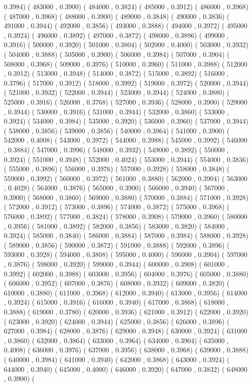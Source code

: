 \documentclass[10pt]{article}
\begin{document}
0.3984)  ( 483000 , 0.3900)  ( 484000 , 0.3824)  ( 485000 , 0.3912)  ( 486000 , 0.3968)  ( 487000 , 0.3968)  ( 488000 , 0.3900)  ( 489000 , 0.3848)  ( 490000 , 0.3836)  ( 491000 , 0.3944)  ( 492000 , 0.3856)  ( 493000 , 0.3888)  ( 494000 , 0.3972)  ( 495000 , 0.3924)  ( 496000 , 0.3892)  ( 497000 , 0.3872)  ( 498000 , 0.3896)  ( 499000 , 0.3916)  ( 500000 , 0.3920)  ( 501000 , 0.3804)  ( 502000 , 0.4000)  ( 503000 , 0.3932)  ( 504000 , 0.3888)  ( 505000 , 0.3900)  ( 506000 , 0.3984)  ( 507000 , 0.3904)  ( 508000 , 0.3968)  ( 509000 , 0.3976)  ( 510000 , 0.3960)  ( 511000 , 0.3988)  ( 512000 , 0.3912)  ( 513000 , 0.3948)  ( 514000 , 0.3872)  ( 515000 , 0.3892)  ( 516000 , 0.3796)  ( 517000 , 0.3912)  ( 518000 , 0.3992)  ( 519000 , 0.3972)  ( 520000 , 0.3944)  ( 521000 , 0.3932)  ( 522000 , 0.3944)  ( 523000 , 0.3944)  ( 524000 , 0.3880)  ( 525000 , 0.3916)  ( 526000 , 0.3768)  ( 527000 , 0.3936)  ( 528000 , 0.3900)  ( 529000 , 0.3944)  ( 530000 , 0.3916)  ( 531000 , 0.3944)  ( 532000 , 0.3860)  ( 533000 , 0.3924)  ( 534000 , 0.3984)  ( 535000 , 0.3920)  ( 536000 , 0.3960)  ( 537000 , 0.3944)  ( 538000 , 0.3856)  ( 539000 , 0.3856)  ( 540000 , 0.3964)  ( 541000 , 0.3900)  ( 542000 , 0.4008)  ( 543000 , 0.3972)  ( 544000 , 0.3988)  ( 545000 , 0.3992)  ( 546000 , 0.3884)  ( 547000 , 0.3996)  ( 548000 , 0.3932)  ( 549000 , 0.3892)  ( 550000 , 0.3924)  ( 551000 , 0.3948)  ( 552000 , 0.4024)  ( 553000 , 0.3944)  ( 554000 , 0.3836)  ( 555000 , 0.3896)  ( 556000 , 0.3976)  ( 557000 , 0.3928)  ( 558000 , 0.3848)  ( 559000 , 0.3992)  ( 560000 , 0.3972)  ( 561000 , 0.3880)  ( 562000 , 0.3904)  ( 563000 , 0.4028)  ( 564000 , 0.3876)  ( 565000 , 0.3900)  ( 566000 , 0.3940)  ( 567000 , 0.3900)  ( 568000 , 0.3860)  ( 569000 , 0.3880)  ( 570000 , 0.3884)  ( 571000 , 0.3928)  ( 572000 , 0.3912)  ( 573000 , 0.3896)  ( 574000 , 0.3872)  ( 575000 , 0.3968)  ( 576000 , 0.3892)  ( 577000 , 0.3824)  ( 578000 , 0.3908)  ( 579000 , 0.3960)  ( 580000 , 0.3956)  ( 581000 , 0.3892)  ( 582000 , 0.3856)  ( 583000 , 0.3820)  ( 584000 , 0.3924)  ( 585000 , 0.3840)  ( 586000 , 0.3884)  ( 587000 , 0.3984)  ( 588000 , 0.3928)  ( 589000 , 0.3856)  ( 590000 , 0.3872)  ( 591000 , 0.3888)  ( 592000 , 0.3896)  ( 593000 , 0.3928)  ( 594000 , 0.3808)  ( 595000 , 0.4000)  ( 596000 , 0.3904)  ( 597000 , 0.3876)  ( 598000 , 0.3920)  ( 599000 , 0.3944)  ( 600000 , 0.3908)  ( 601000 , 0.3992)  ( 602000 , 0.3988)  ( 603000 , 0.3956)  ( 604000 , 0.3976)  ( 605000 , 0.3880)  ( 606000 , 0.3952)  ( 607000 , 0.3876)  ( 608000 , 0.3932)  ( 609000 , 0.3820)  ( 610000 , 0.3880)  ( 611000 , 0.3968)  ( 612000 , 0.3940)  ( 613000 , 0.3956)  ( 614000 , 0.3924)  ( 615000 , 0.3916)  ( 616000 , 0.3940)  ( 617000 , 0.3868)  ( 618000 , 0.3888)  ( 619000 , 0.3780)  ( 620000 , 0.3936)  ( 621000 , 0.3912)  ( 622000 , 0.3920)  ( 623000 , 0.3920)  ( 624000 , 0.3944)  ( 625000 , 0.3856)  ( 626000 , 0.3896)  ( 627000 , 0.3984)  ( 628000 , 0.3876)  ( 629000 , 0.3948)  ( 630000 , 0.3924)  ( 631000 , 0.3860)  ( 632000 , 0.3864)  ( 633000 , 0.3964)  ( 634000 , 0.3904)  ( 635000 , 0.4008)  ( 636000 , 0.3976)  ( 637000 , 0.3956)  ( 638000 , 0.3968)  ( 639000 , 0.3888)  ( 640000 , 0.3984)  ( 641000 , 0.3940)  ( 642000 , 0.3868)  ( 643000 , 0.3924)  ( 644000 , 0.3940)  ( 645000 , 0.4000)  ( 646000 , 0.3920)  ( 647000 , 0.3832)  ( 648000 , 0.3900)  ( 
\end{document}
